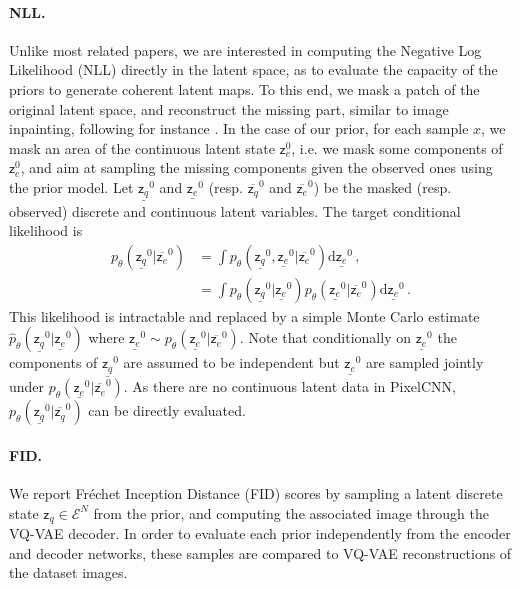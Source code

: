 \documentclass[nohyperref]{article}
\theoremstyle{plain}
\theoremstyle{definition}
\theoremstyle{remark}
\newcommand{\latentcont}{\mathsf{z}_e}
\newcommand{\latentdis}{\mathsf{z}_q}
\newcommand{\embedspace}{\mathcal{E}}
\begin{document}
\paragraph{NLL. }\label{nll_paragraph}
Unlike most related papers, we are interested in computing the Negative Log Likelihood (NLL) directly in the latent space, as to evaluate the capacity of the priors to generate coherent latent maps.
To this end, we mask a patch of the original latent space, and reconstruct the missing part, similar to image inpainting, following for instance \cite{van2016pixel}.
 In the case of our prior, for each sample $x$, we mask an area of the continuous latent state $\latentcont^0$, i.e. we mask some components of $\latentcont^0$, and aim at sampling the missing components given the observed ones using the prior model. Let $\underline{\latentdis}^0$ and $\underline{\latentcont}^0$ (resp. $\overline{\latentdis}^0$ and $\overline{\latentcont}^0$) be the masked (resp. observed) discrete and continuous latent variables. The target conditional likelihood is
\begin{align*}
p_{\theta}(\underline{\latentdis}^0|\overline{\latentcont}^0) &= \int p_{\theta}(\underline{\latentdis}^0,\underline{\latentcont}^0|\overline{\latentcont}^0)\mathrm{d} \underline{\latentcont}^0\,,\\
&= \int p_{\theta}(\underline{\latentdis}^0|\underline{\latentcont}^0)p_{\theta}(\underline{\latentcont}^0|\overline{\latentcont}^0)\mathrm{d} \underline{\latentcont}^0\,.
\end{align*}
This likelihood is intractable and replaced by a simple Monte Carlo estimate $\hat{p}_{\theta}(\underline{\latentdis}^0|\underline{\latentcont}^0)$ where $\underline{\latentcont}^0\sim p_{\theta}(\underline{\latentcont}^0|\overline{\latentcont}^0)$. Note that conditionally on $\underline{\latentcont}^0$ the components of $\underline{\latentdis}^0$ are assumed to be independent but $\underline{\latentcont}^0$ are sampled jointly under $p_{\theta}(\underline{\latentcont}^0|\overline{\latentcont}^0)$. As there are no continuous latent data in PixelCNN, $p_{\theta}(\underline{\latentdis}^0|\overline{\latentdis}^0)$ can be directly evaluated.

\paragraph{FID. }
We report Fr\'echet Inception Distance (FID) scores by sampling a latent discrete state $\latentdis \in \embedspace^N$ from the prior, and computing the associated image through the VQ-VAE decoder. In order to evaluate each prior independently from the encoder and decoder networks, these samples are compared to VQ-VAE reconstructions of the dataset images. 
\end{document}
